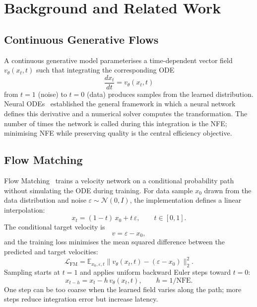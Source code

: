 ﻿\chapter{Background and Related Work}

\section{Continuous Generative Flows}

A continuous generative model parameterises a time-dependent vector field
$v_\theta(x_t, t)$ such that integrating the corresponding ODE
\begin{equation}
  \frac{dx_t}{dt} = v_\theta(x_t, t)
\end{equation}
from $t=1$ (noise) to $t=0$ (data) produces samples from the learned
distribution. Neural ODEs~\cite{chen2018neural} established the general
framework in which a neural network defines this derivative and a numerical
solver computes the transformation. The number of times the network is called
during this integration is the NFE; minimising NFE while preserving quality
is the central efficiency objective.

\section{Flow Matching}

Flow Matching~\cite{lipman2023flow} trains a velocity network on a conditional
probability path without simulating the ODE during training. For data sample
$x_0$ drawn from the data distribution and noise $\varepsilon \sim \mathcal{N}(0,I)$,
the implementation defines a linear interpolation:
\begin{equation}
  x_t = (1 - t)\,x_0 + t\,\varepsilon, \qquad t \in [0, 1].
\end{equation}
The conditional target velocity is
\begin{equation}
  v = \varepsilon - x_0,
\end{equation}
and the training loss minimises the mean squared difference between the predicted
and target velocities:
\begin{equation}
  \mathcal{L}_{\mathrm{FM}}
    = \mathbb{E}_{x_0, \varepsilon, t}\bigl\|v_\theta(x_t, t)
      - (\varepsilon - x_0)\bigr\|_2^2.
\end{equation}
Sampling starts at $t=1$ and applies uniform backward Euler steps toward $t=0$:
\begin{equation}
  x_{t-h} = x_t - h\,v_\theta(x_t, t), \qquad h = 1/\mathrm{NFE}.
\end{equation}
One step can be too coarse when the learned field varies along the path;
more steps reduce integration error but increase latency.


